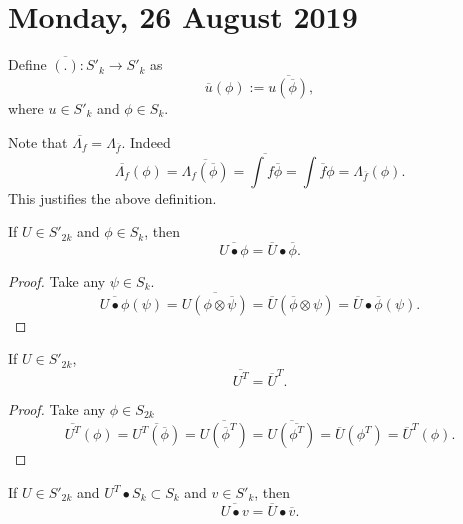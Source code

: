 \documentclass[main.tex]{subfiles}
\begin{document}
\section{Monday, 26 August 2019}
\begin{definition}
Define $\overline{(.)}:S'_k \to S'_k$ as
\begin{equation}
\overline{u}(\phi) := \overline{u(\overline{\phi})},
\end{equation}
where $u\in S'_k$ and $\phi\in S_k$. 
\end{definition}
Note that $\overline{\Lambda_f} = \Lambda_{\overline{f}}$. Indeed
\begin{equation}
\overline{\Lambda_f}(\phi) = \overline{\Lambda_f(\overline{\phi})}=
\overline{\int f \overline{\phi}} = \int \overline{f} \phi = \Lambda_{\overline{f}}(\phi).
\end{equation}
This justifies the above definition.
\begin{lemma}
If $U\in S'_{2k}$ and $\phi\in S_k$, then
\begin{equation}
\overline{U \bullet \phi} = \overline{U} \bullet \overline{\phi}. 
\end{equation}
\end{lemma}
\begin{proof}
Take any $\psi\in S_k$.
\begin{equation}
\overline{U \bullet \phi}(\psi) = \overline{U(\phi\otimes \overline{\psi})}= \overline{U}(\overline{\phi}\otimes\psi) = \overline{U} \bullet \overline{\phi}(\psi).
\end{equation}
\end{proof}
\begin{theorem}
If $U\in S'_{2k}$,
\begin{equation}
\overline{U^T} = \overline{U}^T.
\end{equation}
\begin{proof}
Take any $\phi\in S_{2k}$
\begin{equation}
\overline{U^T}(\phi) = \overline{U^T(\overline{\phi})} = \overline{U(\overline{\phi}^T)} = \overline{U(\overline{\phi^T})} = \overline{U}(\phi^T) = \overline{U}^T(\phi).
\end{equation}
\end{proof}
\end{theorem}
\begin{theorem}
\label{complex-conjugate-over-bullet}
If $U\in S'_{2k}$ and $U^T\bullet S_k \subset S_k$ and $v\in S'_k$, then
\begin{equation}
\overline{U \bullet v} = \overline{U} \bullet \overline{v}. 
\end{equation}
\end{theorem}
\end{document}
